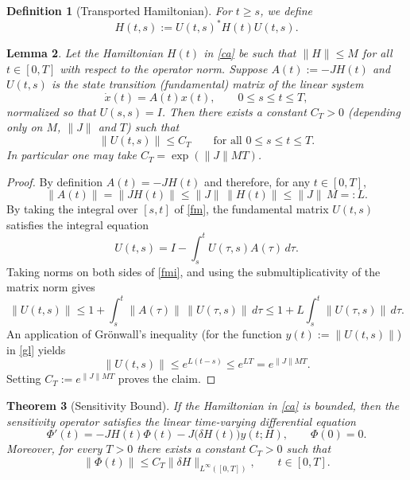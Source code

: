 \documentclass[reqno]{amsart}
\numberwithin{equation}{section}
\newtheorem{theorem}{Theorem}[section]
\newtheorem{lemma}[theorem]{Lemma}
\newtheorem{defi}[theorem]{Definition}
\begin{document}
\begin{defi}[Transported Hamiltonian]
For $t\ge s$, we define
\[
H(t,s):=U(t,s)^{*}H(t)U(t,s).
\]
\end{defi}

\begin{lemma}
\label{lem:fund-solution-bound}
Let the Hamiltonian $H(t)$ in \eqref{ca} be such that   $ \| H\| \leq M $ for all $ t \in [0, T]$  with respect to the operator norm.  Suppose $A(t):= -JH(t)$ and  $U(t,s)$ is the state transition (fundamental) matrix of the linear system
\[
\dot x(t)=A(t)x(t),\qquad 0\le s\le t\le T,
\]
normalized so that $U(s,s)=I$. Then there exists a constant $C_T>0$ (depending only on $M$, $\|J\|$ and $T$) such that
\[
\|U(t,s)\|\le C_T\qquad\text{for all }0\le s\le t\le T.
\]
In particular one may take $C_T=\exp(\|J\| M T)$.
\end{lemma}

\begin{proof}
By definition $A(t)= -JH(t)$ and therefore, for any $t\in[0,T]$,
\[
\|A(t)\|=\|JH(t)\|\le\|J\|\,\|H(t)\|\le \|J\|\,M=:L.
\]
By taking the integral over $[s, t]$ of \eqref{fm}, the fundamental matrix $U(t,s)$ satisfies the integral equation
\begin{equation} \label{fmi}
U(t,s)=I-\int_s^t U(\tau,s)A(\tau) \,d\tau.
\end{equation}
Taking norms on both sides of \eqref{fmi}, and using the submultiplicativity of the matrix norm gives
\begin{equation}\label{gl}
\|U(t,s)\|\le 1+\int_s^t \|A(\tau)\|\,\|U(\tau,s)\|\,d\tau
\le 1+L\int_s^t \|U(\tau,s)\|\,d\tau.
\end{equation}
An application of Gr\"onwall's inequality (for the function $y(t):=\|U(t,s)\|$) in \eqref{gl} yields
\[
\|U(t,s)\|\le e^{L(t-s)}\le e^{L T}=e^{\|J\| M T}.
\]
Setting $C_T:=e^{\|J\| M T}$ proves the claim.
\end{proof}
\begin{theorem}[Sensitivity Bound]\label{thm:sensitivity}
If the Hamiltonian in \eqref{ca} is bounded, then the sensitivity operator satisfies the linear time-varying differential equation
\begin{equation}\label{eq:Phi-eq}
    \Phi'(t) 
    = -J H(t)\Phi(t) - J \big(\delta H(t)\big) y(t;H), 
    \qquad \Phi(0)=0.
\end{equation}
Moreover, for every $T>0$ there exists a constant $C_T>0$ such that
\begin{equation}\label{bd}
    \|\Phi(t)\| \le C_T \|\delta H\|_{L^\infty([0,T])},
    \qquad t\in[0,T].
\end{equation}
\end{theorem}
\end{document}
